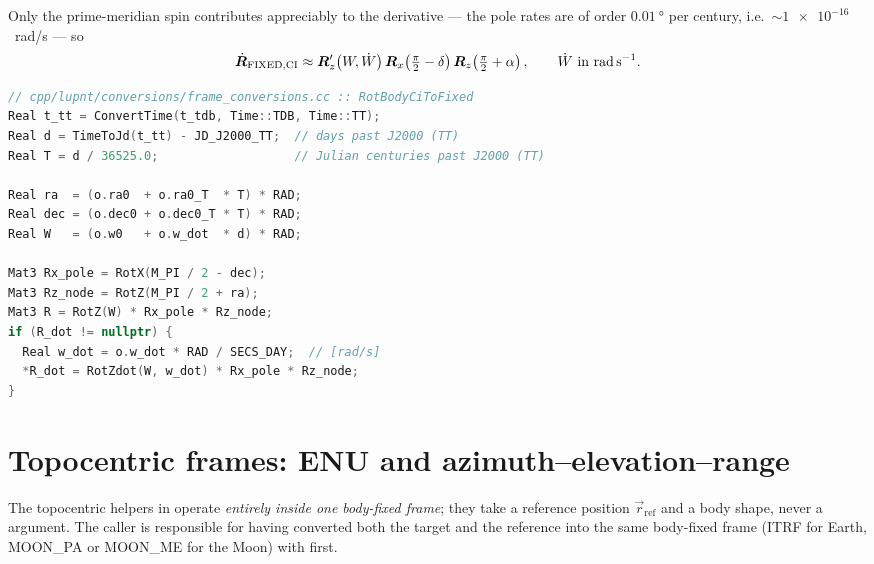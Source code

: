 Only the prime-meridian spin contributes appreciably to the derivative --- the
pole rates are of order $\SI{0.01}{\degree}$ per century, i.e.\
$\sim\num{1e-16}$~rad/s --- so
%
\begin{equation}
  \label{eq:fc-iau-dot}
  \dot{\bm{R}}_{\mathrm{FIXED},\mathrm{CI}}
  \approx \bm{R}_z'\!\left(W, \dot{W}\right)
    \bm{R}_x\!\left(\tfrac{\pi}{2}-\delta\right)
    \bm{R}_z\!\left(\tfrac{\pi}{2}+\alpha\right),
  \qquad
  \dot{W}\ \text{in \si{\radian\per\second}}.
\end{equation}

\begin{lstlisting}[language=cpp, caption={IAU body orientation
  (\texttt{cpp/lupnt/conversions/frame\_conversions.cc}).},
  label={lst:fc-iau}]
// cpp/lupnt/conversions/frame_conversions.cc :: RotBodyCiToFixed
Real t_tt = ConvertTime(t_tdb, Time::TDB, Time::TT);
Real d = TimeToJd(t_tt) - JD_J2000_TT;  // days past J2000 (TT)
Real T = d / 36525.0;                   // Julian centuries past J2000 (TT)

Real ra  = (o.ra0  + o.ra0_T  * T) * RAD;
Real dec = (o.dec0 + o.dec0_T * T) * RAD;
Real W   = (o.w0   + o.w_dot  * d) * RAD;

Mat3 Rx_pole = RotX(M_PI / 2 - dec);
Mat3 Rz_node = RotZ(M_PI / 2 + ra);
Mat3 R = RotZ(W) * Rx_pole * Rz_node;
if (R_dot != nullptr) {
  Real w_dot = o.w_dot * RAD / SECS_DAY;  // [rad/s]
  *R_dot = RotZdot(W, w_dot) * Rx_pole * Rz_node;
}
\end{lstlisting}

\section{Topocentric frames: ENU and azimuth--elevation--range}
\label{sec:fc-topocentric}

The topocentric helpers in
 operate
\emph{entirely inside one body-fixed frame}; they take a reference position
$\vec{r}_{\mathrm{ref}}$ and a body shape, never a \cpp{Frame} argument. The
caller is responsible for having converted both the target and the reference
into the same body-fixed frame (ITRF for Earth, MOON\_PA or MOON\_ME for the
Moon) with \cpp{ConvertFrame} first.

